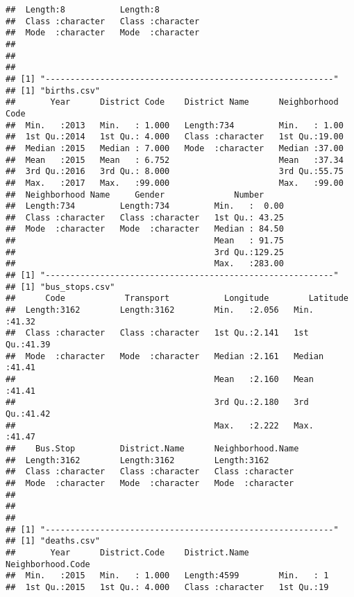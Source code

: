\documentclass[
]{article}
\begin{document}
\begin{verbatim}
##  Length:8           Length:8          
##  Class :character   Class :character  
##  Mode  :character   Mode  :character  
##                                       
##                                       
##                                       
## [1] "----------------------------------------------------------"
## [1] "births.csv"
##       Year      District Code    District Name      Neighborhood Code
##  Min.   :2013   Min.   : 1.000   Length:734         Min.   : 1.00    
##  1st Qu.:2014   1st Qu.: 4.000   Class :character   1st Qu.:19.00    
##  Median :2015   Median : 7.000   Mode  :character   Median :37.00    
##  Mean   :2015   Mean   : 6.752                      Mean   :37.34    
##  3rd Qu.:2016   3rd Qu.: 8.000                      3rd Qu.:55.75    
##  Max.   :2017   Max.   :99.000                      Max.   :99.00    
##  Neighborhood Name     Gender              Number      
##  Length:734         Length:734         Min.   :  0.00  
##  Class :character   Class :character   1st Qu.: 43.25  
##  Mode  :character   Mode  :character   Median : 84.50  
##                                        Mean   : 91.75  
##                                        3rd Qu.:129.25  
##                                        Max.   :283.00  
## [1] "----------------------------------------------------------"
## [1] "bus_stops.csv"
##      Code            Transport           Longitude        Latitude    
##  Length:3162        Length:3162        Min.   :2.056   Min.   :41.32  
##  Class :character   Class :character   1st Qu.:2.141   1st Qu.:41.39  
##  Mode  :character   Mode  :character   Median :2.161   Median :41.41  
##                                        Mean   :2.160   Mean   :41.41  
##                                        3rd Qu.:2.180   3rd Qu.:41.42  
##                                        Max.   :2.222   Max.   :41.47  
##    Bus.Stop         District.Name      Neighborhood.Name 
##  Length:3162        Length:3162        Length:3162       
##  Class :character   Class :character   Class :character  
##  Mode  :character   Mode  :character   Mode  :character  
##                                                          
##                                                          
##                                                          
## [1] "----------------------------------------------------------"
## [1] "deaths.csv"
##       Year      District.Code    District.Name      Neighborhood.Code
##  Min.   :2015   Min.   : 1.000   Length:4599        Min.   : 1       
##  1st Qu.:2015   1st Qu.: 4.000   Class :character   1st Qu.:19       

\end{verbatim}
\end{document}
